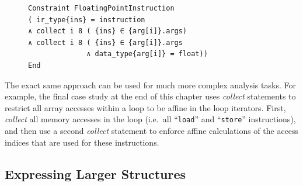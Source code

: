 \begin{figure}[H]
\vspace{3.6mm}
\begin{lstlisting}[language=CAnDL,label={fig:collectexample},caption=
   {{\it Collect} restricts ``{\tt ins}'' to instructions with only
    (up to 8) floating-point operands.\leftskip=0pt\rightskip=0pt}]
Constraint FloatingPointInstruction
( ir_type{ins} = instruction
∧ collect i 8 ( {ins} ∈ {arg[i]}.args)
∧ collect i 8 ( {ins} ∈ {arg[i]}.args
              ∧ data_type{arg[i]} = float))
End
\end{lstlisting}
\end{figure}

    The exact same approach can be used for much more complex analysis tasks.
    For example, the final case study at the end of this chapter uses
    {\it collect} statements to restrict all array accesses within a
    loop to be affine in the loop iterators.
    First, {\it collect} all memory accesses in the loop
    (i.e.\ all ``{\tt load}'' and ``{\tt store}'' instructions), and then use a
    second {\it collect} statement to enforce affine calculations of the access
    indices that are used for these instructions.

\subsection{Expressing Larger Structures}

